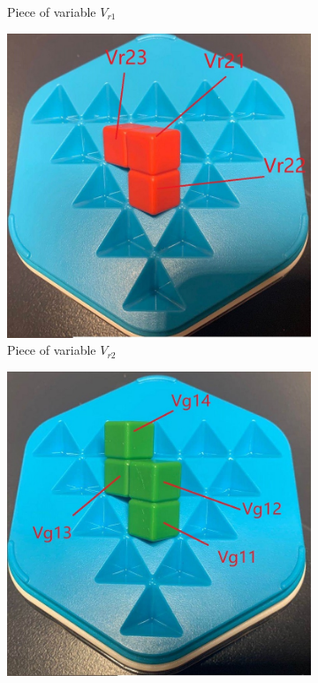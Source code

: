 \begin{figure}[htbp]
\begin{subfigure}[b]{0.25\textwidth}
\caption{Piece of variable $V_{r1}$}
  \label{fig:3Dred1}
\end{subfigure}
\begin{subfigure}[b]{0.25\textwidth}
\centering
\includegraphics[width=\textwidth]{figs/3Dred2.jpg}
\caption{Piece of variable $V_{r2}$}
  \label{fig:3Dred2}
\end{subfigure}
\begin{subfigure}[b]{0.25\textwidth}
\centering
\includegraphics[width=\textwidth]{figs/3Dgreen1.jpg}

\end{subfigure}
\end{figure}
